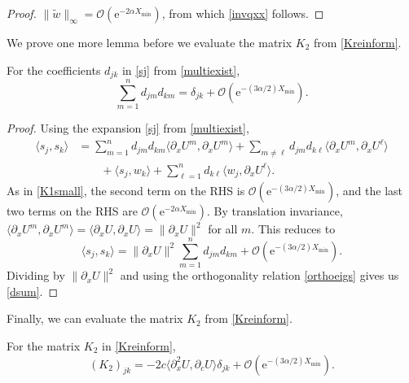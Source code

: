 \documentclass[review,onefignum,onetabnum]{siamart171218}
\newcommand{\rme}{\mathrm{e}}
\newcommand{\vK}{\bm{\mathit{K}}}
\begin{document}
\begin{proof}
$\|\tilde{w}\|_\infty = \mathcal{O}(\rme^{-2 \alpha X_{\mathrm{min}}})$, from which \cref{invqxx} follows.
\end{proof}

We prove one more lemma before we evaluate the matrix $\vK_2$ from \cref{Kreinform}.


\begin{lemma}\label{orthogonald}
For the coefficients $d_{jk}$ in \cref{sj} from \cref{multiexist},
\begin{equation}\label{dsum}
\sum_{m = 1}^{n} d_{jm} d_{km} = \delta_{jk} + \mathcal{O}(\rme^{-(3 \alpha/2) X_{\mathrm{min}}}).
\end{equation}
\end{lemma}

\begin{proof}
Using the expansion \cref{sj} from \cref{multiexist},
\[
\begin{aligned}
\langle s_j, s_k \rangle
&= \sum_{m = 1}^{n} d_{jm} d_{km} \langle \partial_xU^m,\partial_xU^m \rangle
+ \sum_{m \neq \ell} d_{jm} d_{k\ell} \langle \partial_xU^m, \partial_xU^\ell \rangle\\
&\qquad
+ \langle s_j, w_k \rangle
+ \sum_{\ell = 1}^{n} d_{k\ell} \langle w_j, \partial_xU^\ell \rangle.
\end{aligned}
\]
As in \cref{K1small}, the second term on the RHS is $\mathcal{O}(\rme^{-(3 \alpha/2) X_{\mathrm{min}}})$, and the last two terms on the RHS are $\mathcal{O}(\rme^{-2 \alpha X_{\mathrm{min}}})$. By translation invariance, $\langle \partial_xU^m, \partial_xU^m \rangle = \langle \partial_xU, \partial_xU \rangle = \|\partial_xU\|^2$ for all $m$. This reduces to
\[
\langle s_j, s_k \rangle
= \|\partial_xU\|^2 \sum_{m = 1}^{n} d_{jm} d_{km} + \mathcal{O}(\rme^{-(3 \alpha/2) X_{\mathrm{min}}}).
\]
Dividing by $\|\partial_xU\|^2$ and using the orthogonality relation \cref{orthoeigs} gives us \cref{dsum}.
\end{proof}

Finally, we can evaluate the matrix $\vK_2$ from \cref{Kreinform}.


\begin{lemma}\label{K2diag}
For the matrix $\vK_2$ in \cref{Kreinform},
\begin{equation}\label{K2final}
(\vK_2)_{jk}
= -2 c\langle\partial_x^2 U, \partial_c U \rangle \delta_{jk} + \mathcal{O}(\rme^{-(3 \alpha/2) X_{\mathrm{min}}}).
\end{equation}
\end{lemma}
\end{document}
